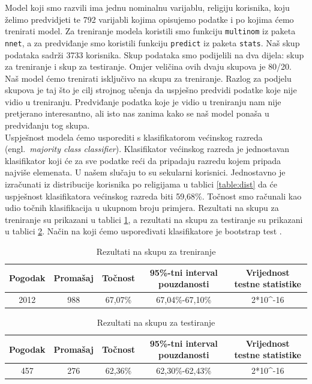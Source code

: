 \documentclass[times,utf8,zavrsni]{fer}
\begin{document}
Model koji smo razvili ima jednu nominalnu varijablu, religiju korisnika, koju želimo predvidjeti te 792 varijabli kojima opisujemo podatke i po kojima ćemo trenirati model. Za treniranje modela koristili smo funkciju \texttt{multinom} iz paketa \texttt{nnet}, a za predviđanje smo koristili funkciju \texttt{predict} iz paketa \texttt{stats}. Naš skup podataka sadrži 3733 korisnika. Skup podataka smo podijelili na dva dijela: skup za treniranje i skup za testiranje. Omjer veličina ovih dvaju skupova je 80/20. Naš model ćemo trenirati isključivo na skupu za treniranje. Razlog za podjelu skupova je taj što je cilj strojnog učenja da uspješno predvidi podatke koje nije vidio u treniranju. Predviđanje podatka koje je vidio u treniranju nam nije pretjerano interesantno, ali isto nas zanima kako se naš model ponaša u predviđanju tog skupa. \\

Uspješnost modela ćemo usporediti s klasifikatorom većinskog razreda (engl.~\emph{majority class classifier}). Klasifikator većinskog razreda je jednostavan klasifikator koji će za sve podatke reći da pripadaju razredu kojem pripada najviše elemenata. U našem slučaju to su sekularni korisnici. Jednostavno je izračunati iz distribucije korisnika po religijama u tablici \ref{table:dist} da će uspješnost klasifikatora većinskog razreda biti 59,68\%. Točnost smo računali kao udio točnih klasifikacija u ukupnom broju primjera. Rezultati na skupu za treniranje su prikazani u tablici \ref{table:logTrain}, a rezultati na skupu za testiranje su prikazani u tablici \ref{table:logTest}. Način na koji ćemo uspoređivati klasifikatore je bootstrap test \citep{bootstrap}.

\begin{table}[h!]
\centering
\small
\caption{Rezultati na skupu za treniranje}
\label{table:logTrain}
\begin{tabular}{@{}ccccc@{}}
\hline
Pogodak & Promašaj & Točnost  & 95\%-tni interval pouzdanosti & Vrijednost testne statistike\\
\hline
\hline
2012     & 988      & 67,07\% & 67,04\%-67,10\% & 2*10\textasciicircum{}-16 \\
\hline
\end{tabular}
\end{table}


\begin{table}[h!]
\centering
\small
\caption{Rezultati na skupu za testiranje}
\label{table:logTest}
\begin{tabular}{@{}ccccc@{}}
\hline
Pogodak & Promašaj & Točnost  & 95\%-tni interval pouzdanosti & Vrijednost testne statistike\\
\hline
\hline
457     & 276      & 62,36\% & 62,30\%-62,43\% & 2*10\textasciicircum{}-16 \\
\hline
\end{tabular}
\end{table}
\end{document}
